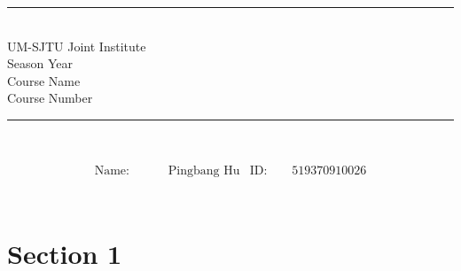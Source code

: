 \documentclass[13pt]{article}
\begin{document}
    \vspace{5cm}
    \begin{center}
        \rule{15cm}{0.01cm}
        \\\LARGE{
            UM-SJTU Joint Institute
            \\Season Year
            \\Course Name
            \\Course Number
          }
        \\\rule{15cm}{0.01cm}
        \\\vspace{6cm}
        \begin{Huge}
        \end{Huge}
    \end{center}
    \vfill
    \flushleft
    \begin{center}
        \begin{align*}
            \qquad\qquad\text{Name: }   \qquad& \text{Pingbang Hu}  &   \text{ID:} \qquad \text{519370910026}\qquad\qquad\\
        \end{align*}
        \mbox{}
        \\
    \end{center}

\setlength{\parindent}{1em}
\newpage
\thispagestyle{empty}
\setcounter{page}{1}

\newpage
\section*{Section 1}
\end{document}
